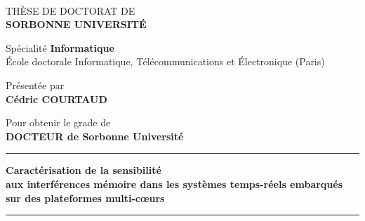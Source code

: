 
\thispagestyle{empty}


{\


\begin{center}


TH\`ESE DE DOCTORAT DE \\ \textbf{SORBONNE UNIVERSIT\'E}


Sp\'ecialit\'e
\textbf{Informatique}\ \\ 


\'Ecole doctorale Informatique, T\'el\'ecommunications et \'Electronique (Paris)



Pr\'esent\'ee par \ \\


{\Large \textbf{C\'edric COURTAUD}}

Pour obtenir le grade de \ \\[1ex]
\textbf{DOCTEUR de Sorbonne Universit\'e} \ \\


\end{center}

\rule{\linewidth}{1pt}
{\Large 
 \begin{center}
	\textbf{Caract\'erisation de la sensibilit\'e \\ aux  interf\'erences m\'emoire dans les syst\`emes temps-r\'eels embarqu\'es sur des plateformes multi-c\oe{}urs}
 \end{center}
 }
\rule{\linewidth}{1pt}

\


}
